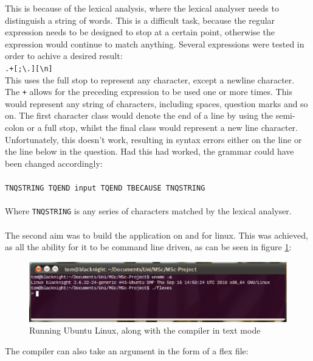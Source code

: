 \documentclass[12pt]{report}
\begin{document}
This is because of the lexical analysis, where the lexical analyser needs to distinguish a string of words.  This is a difficult task, because the regular expression needs to be designed to stop at a certain point, otherwise the expression would continue to match anything.  Several expressions were tested in order to achive a desired result:
\\
\texttt{.+[;\textbackslash .][\textbackslash n]}
\\
This uses the full stop to represent any character, except a newline character.  The \texttt{+} allows for the preceding expression to be used one or more times.  This would represent any string of characters, including spaces, question marks and so on.  The first character class would denote the end of a line by using the semi-colon or a full stop, whilst the final class would represent a new line character.  Unfortunately, this doesn't work, resulting in syntax errors either on the line or the line below in the question.
Had this had worked, the grammar could have been changed accordingly:\\
\\
\texttt{TNQSTRING TQEND input TQEND TBECAUSE TNQSTRING}\\
\\
Where \texttt{TNQSTRING} is any series of characters matched by the lexical analyser.\\
\\
The second aim was to build the application on and for linux.  This was achieved, as all the ability for it to be command line driven, as can be seen in figure \ref{fig:linux}:
\begin{figure}[H]
	\centering
	\includegraphics[scale=0.75]{linux}
	\caption{Running Ubuntu Linux, along with the compiler in text mode}\label{fig:linux}
\end{figure}
The compiler can also take an argument in the form of a flex file:
\end{document}
